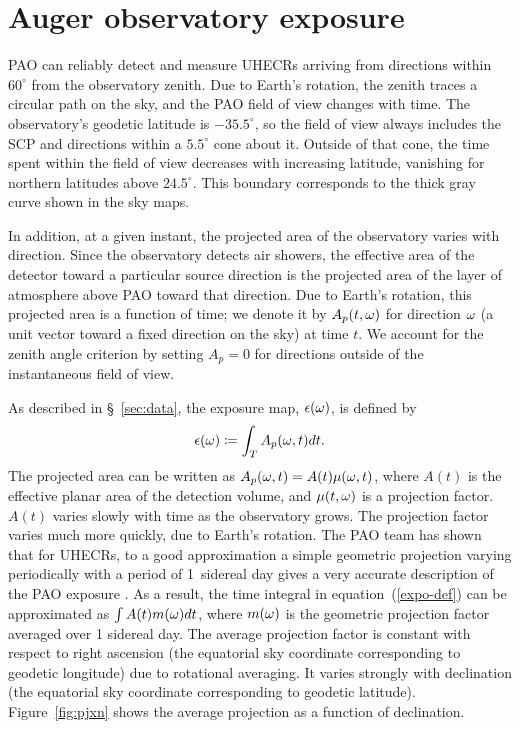 \section{Auger observatory exposure}
\label{app:expo}

PAO can reliably detect and measure UHECRs arriving from directions within
$60^\circ$ from the observatory zenith.  Due to Earth's rotation, the zenith
traces a circular path on the sky, and the PAO field of view changes with time.
The observatory's geodetic latitude is $-35.5^\circ$, so the field of view
always includes the SCP and directions within a $5.5^\circ$ cone about it.
Outside of that cone, the time spent within the field of view decreases with
increasing latitude, vanishing for northern latitudes above $24.5^\circ$.  This
boundary corresponds to the thick gray curve shown in the sky maps.

In addition, at a given instant, the projected area of the observatory varies
with direction.  Since the observatory detects air showers, the effective area
of the detector toward a particular source direction is the projected area of
the layer of atmosphere above PAO toward that direction.  Due to Earth's
rotation, this projected area is a function of time; we denote it by
$A_p(t,\omega)$ for direction $\omega$ (a unit vector toward a fixed direction
on the sky) at time $t$.  We account for the zenith angle criterion by
setting $A_p=0$ for directions outside of the instantaneous field of view.

As described in \S~\ref{sec:data}, the exposure map, $\epsilon(\omega)$,
is defined by
\begin{equation}
\expo(\tdrxn) \coloneqq \int_T  A_p(\tdrxn,t) dt.
\label{expo-def}
\end{equation}
The projected area can be written as $A_p(\omega,t) = A(t) \mu(\omega,t)$,
where $A(t)$ is the effective planar area of the detection volume, and
$\mu(t,\omega)$ is a projection factor.  $A(t)$ varies slowly with time as
the observatory grows.  The projection factor varies much more quickly, due
to Earth's rotation. The PAO team has shown that for UHECRs, to a good
approximation a simple geometric projection varying periodically with a
period of 1~sidereal day gives a very accurate description of the PAO
exposure \cite{2001APh....14..271S}. As a result, the time integral in
equation~(\ref{expo-def}) can be approximated as $\int A(t) m(\omega) dt$,
where $m(\omega)$ is the geometric projection factor averaged over 1
sidereal day. The average projection factor is constant with respect to
right ascension (the equatorial sky coordinate corresponding to geodetic
longitude) due to rotational averaging.  It varies strongly with declination
(the equatorial sky coordinate corresponding to geodetic latitude).
Figure~\ref{fig:pjxn} shows the average projection as a function of
declination.

